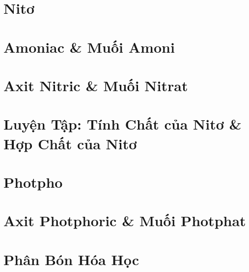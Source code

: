 \documentclass[oneside]{book}
\numberwithin{equation}{section}
\begin{document}

\section{Nitơ}


\section{Amoniac \& Muối Amoni}


\section{Axit Nitric \& Muối Nitrat}


\section{Luyện Tập: Tính Chất của Nitơ \& Hợp Chất của Nitơ}


\section{Photpho}


\section{Axit Photphoric \& Muối Photphat}


\section{Phân Bón Hóa Học}

\end{document}
